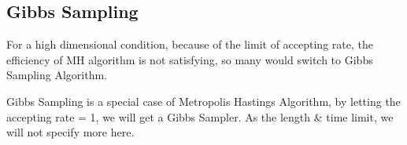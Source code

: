 \subsection{Gibbs Sampling}
For a high dimensional condition, because of the limit of accepting rate, the efficiency of MH algorithm is not satisfying, so many would switch to Gibbs Sampling Algorithm.

Gibbs Sampling is a special case of Metropolis Hastings Algorithm, by letting the accepting rate = 1, we will get a Gibbs Sampler. As the length \& time limit, we will not specify more here.






